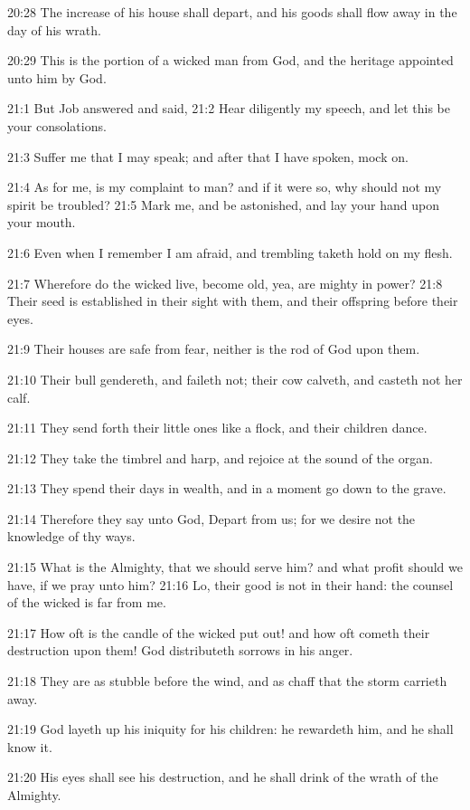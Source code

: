 20:28 The increase of his house shall depart, and his goods shall flow away in the day of his wrath.

20:29 This is the portion of a wicked man from God, and the heritage appointed unto him by God.

21:1 But Job answered and said, 21:2 Hear diligently my speech, and let this be your consolations.

21:3 Suffer me that I may speak; and after that I have spoken, mock on.

21:4 As for me, is my complaint to man? and if it were so, why should not my spirit be troubled?  21:5 Mark me, and be astonished, and lay your hand upon your mouth.

21:6 Even when I remember I am afraid, and trembling taketh hold on my flesh.

21:7 Wherefore do the wicked live, become old, yea, are mighty in power?  21:8 Their seed is established in their sight with them, and their offspring before their eyes.

21:9 Their houses are safe from fear, neither is the rod of God upon them.

21:10 Their bull gendereth, and faileth not; their cow calveth, and casteth not her calf.

21:11 They send forth their little ones like a flock, and their children dance.

21:12 They take the timbrel and harp, and rejoice at the sound of the organ.

21:13 They spend their days in wealth, and in a moment go down to the grave.

21:14 Therefore they say unto God, Depart from us; for we desire not the knowledge of thy ways.

21:15 What is the Almighty, that we should serve him? and what profit should we have, if we pray unto him?  21:16 Lo, their good is not in their hand: the counsel of the wicked is far from me.

21:17 How oft is the candle of the wicked put out! and how oft cometh their destruction upon them! God distributeth sorrows in his anger.

21:18 They are as stubble before the wind, and as chaff that the storm carrieth away.

21:19 God layeth up his iniquity for his children: he rewardeth him, and he shall know it.

21:20 His eyes shall see his destruction, and he shall drink of the wrath of the Almighty.

